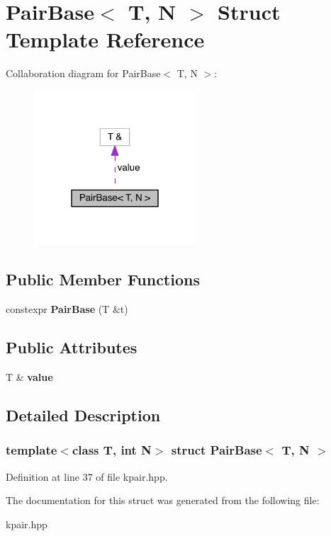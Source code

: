 \hypertarget{struct_pair_base}{}\section{Pair\+Base$<$ T, N $>$ Struct Template Reference}
\label{struct_pair_base}


Collaboration diagram for Pair\+Base$<$ T, N $>$\+:
\nopagebreak
\begin{figure}[H]
\begin{center}
\leavevmode
\includegraphics[width=171pt]{struct_pair_base__coll__graph}
\end{center}
\end{figure}
\subsection*{Public Member Functions}
\begin{DoxyCompactItemize}
\item 
\hypertarget{struct_pair_base_a74897d83ef0c1eeff4ea3527370b459f}{}\label{struct_pair_base_a74897d83ef0c1eeff4ea3527370b459f} 
constexpr {\bfseries Pair\+Base} (T \&t)
\end{DoxyCompactItemize}
\subsection*{Public Attributes}
\begin{DoxyCompactItemize}
\item 
\hypertarget{struct_pair_base_aebb1661543a73e12551e2c1778a387dc}{}\label{struct_pair_base_aebb1661543a73e12551e2c1778a387dc} 
T \& {\bfseries value}
\end{DoxyCompactItemize}


\subsection{Detailed Description}
\subsubsection*{template$<$class T, int N$>$\newline
struct Pair\+Base$<$ T, N $>$}



Definition at line 37 of file kpair.\+hpp.



The documentation for this struct was generated from the following file\+:\begin{DoxyCompactItemize}
\item 
kpair.\+hpp\end{DoxyCompactItemize}

